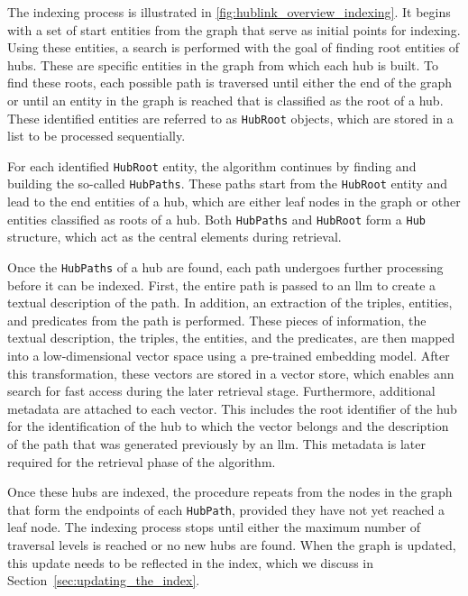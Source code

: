 The indexing process is illustrated in \autoref{fig:hublink_overview_indexing}. It begins with a set of start entities from the graph that serve as initial points for indexing. Using these entities, a search is performed with the goal of finding root entities of hubs. These are specific entities in the graph from which each hub is built. To find these roots, each possible path is traversed until either the end of the graph or until an entity in the graph is reached that is classified as the root of a hub. These identified entities are referred to as \texttt{HubRoot} objects, which are stored in a list to be processed sequentially.

For each identified \texttt{HubRoot} entity, the algorithm continues by finding and building the so-called \texttt{HubPaths}. These paths start from the \texttt{HubRoot} entity and lead to the end entities of a hub, which are either leaf nodes in the graph or other entities classified as roots of a hub. Both \texttt{HubPaths} and \texttt{HubRoot} form a \texttt{Hub} structure, which act as the central elements during retrieval.

Once the \texttt{HubPaths} of a hub are found, each path undergoes further processing before it can be indexed. First, the entire path is passed to an \gls{llm} to create a textual description of the path. In addition, an extraction of the triples, entities, and predicates from the path is performed. These pieces of information, the textual description, the triples, the entities, and the predicates, are then mapped into a low-dimensional vector space using a pre-trained embedding model. After this transformation, these vectors are stored in a vector store, which enables \gls{ann} search for fast access during the later retrieval stage. Furthermore, additional metadata are attached to each vector. This includes the root identifier of the hub for the identification of the hub to which the vector belongs and the description of the path that was generated previously by an \gls{llm}. This metadata is later required for the retrieval phase of the algorithm.

Once these hubs are indexed, the procedure repeats from the nodes in the graph that form the endpoints of each \texttt{HubPath}, provided they have not yet reached a leaf node. The indexing process stops until either the maximum number of traversal levels is reached or no new hubs are found. When the graph is updated, this update needs to be reflected in the index, which we discuss in Section~\ref{sec:updating_the_index}.


